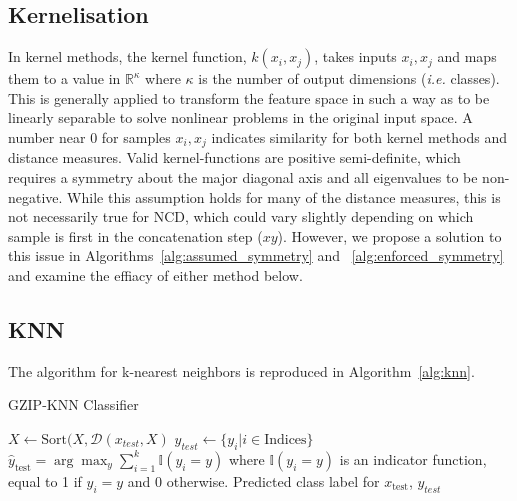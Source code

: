 \documentclass[conference]{IEEEtran}
\newcommand{\cm}[1]{\textit{{\color{blue}#1}}}
\begin{document}
\subsection{Kernelisation}

In kernel methods, the kernel function, $k(x_i,x_j)$, takes inputs $x_i, x_j$ and maps them to a value in $\mathbb{R}^\kappa$ where $\kappa$ is the number of output dimensions (\textit{i.e.} classes). This is generally applied to transform the feature space in such a way as to be linearly separable to solve nonlinear problems in the original input space. A number near 0 for samples $x_i, x_j$ indicates similarity for both kernel methods and distance measures. Valid kernel-functions are positive semi-definite, which requires a symmetry about the major diagonal axis and all eigenvalues to be non-negative. While this assumption holds for many of the distance measures, this is not necessarily true for NCD, which could vary slightly depending on which sample is first in the concatenation step ($xy$). However, we propose a solution to this issue in Algorithms~\ref{alg:assumed_symmetry} and ~\ref{alg:enforced_symmetry} and examine the effiacy of either method below.

\subsection{KNN}
The algorithm for k-nearest neighbors is reproduced in Algorithm~\ref{alg:knn}.

\begin{algorithm}
    \caption{GZIP-KNN Classifier}
    \label{alg:knn}
    \begin{algorithmic}
    \State $ X \leftarrow \textrm{Sort}(X, \mathcal{D}(x_{test}, X)
    $
    \State $y_{test} \leftarrow \{y_i | i \in \textrm{Indices}\}$
    \State $\hat{y}_{\text{test}} = \arg\max_y \sum_{i=1}^{k} \mathbb{I}(y_i = y)$
    where $\mathbb{I}(y_i = y)$ is an indicator function, equal to 1 if $y_i = y$ and 0 otherwise.
    \State \Return Predicted class label for $x_{\text{test}}$, $y_{test}$
    \end{algorithmic}
\end{algorithm}
\end{document}
